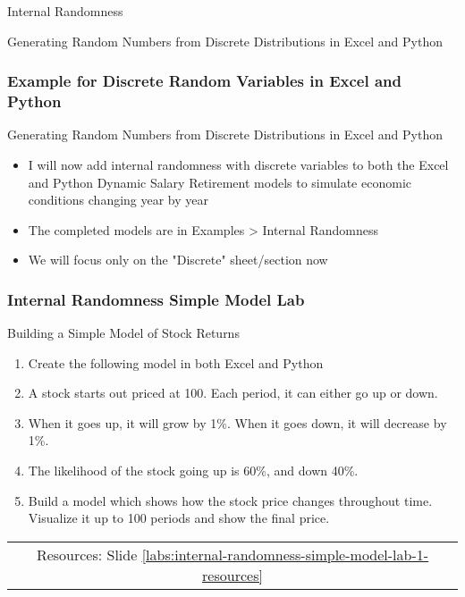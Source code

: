 \documentclass[handout, 11pt]{beamer}
\begin{document}
\begin{section}{Internal Randomness}
\begin{frame}
{\begin{block}{Generating Random Numbers from Discrete Distributions in Excel and Python}
\begin{itemize}
\end{itemize}
\end{block}
}
\end{frame}
\begin{frame}
\frametitle{Example for Discrete Random Variables in Excel and Python}
{
\begin{block}{Generating Random Numbers from Discrete Distributions in Excel and Python}
\begin{itemize}
\item I will now add internal randomness with discrete variables to both the Excel and Python Dynamic Salary Retirement models to simulate economic conditions changing year by year
\item The completed models are in Examples > Internal Randomness
\item We will focus only on the "Discrete" sheet/section now
\end{itemize}
\end{block}
}
\end{frame}
\begin{frame}
\frametitle{Internal Randomness Simple Model Lab}
{
\begin{block}{Building a Simple Model of Stock Returns}
\begin{enumerate}
\item Create the following model in both Excel and Python
\item A stock starts out priced at 100. Each period, it can either go up or down.
\item When it goes up, it will grow by 1\%. When it goes down, it will decrease by 1\%.
\item The likelihood of the stock going up is 60\%, and down 40\%.
\item Build a model which shows how the stock price changes throughout time. Visualize it up to 100 periods and show the final price.
\end{enumerate}
\vfill
\begin{tabular*}{\textwidth}{@{\extracolsep{\fill}}ccc}
\toprule
\hfill & Resources: Slide \textcolor{blue}{\underline{\ref{labs:internal-randomness-simple-model-lab-1-resources}}} & \hfill\\


\end{tabular*}
\end{block}}
\end{frame}
\end{section}
\end{document}
